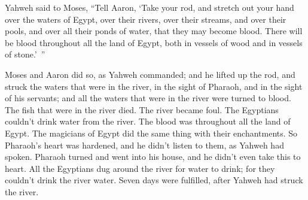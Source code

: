 {Yahweh said to Moses, “Tell Aaron, ‘Take your rod, and stretch out your hand over the waters of Egypt, over their rivers, over their streams, and over their pools, and over all their ponds of water, that they may become blood. There will be blood throughout all the land of Egypt, both in vessels of wood and in vessels of stone.’ ”
\par }{\PP {}Moses and Aaron did so, as Yahweh commanded; and he lifted up the rod, and struck the waters that were in the river, in the sight of Pharaoh, and in the sight of his servants; and all the waters that were in the river were turned to blood.
The fish that were in the river died. The river became foul. The Egyptians couldn’t drink water from the river. The blood was throughout all the land of Egypt.
The magicians of Egypt did the same thing with their enchantments. So Pharaoh’s heart was hardened, and he didn’t listen to them, as Yahweh had spoken.
Pharaoh turned and went into his house, and he didn’t even take this to heart.
All the Egyptians dug around the river for water to drink; for they couldn’t drink the river water.
Seven days were fulfilled, after Yahweh had struck the river.

}
